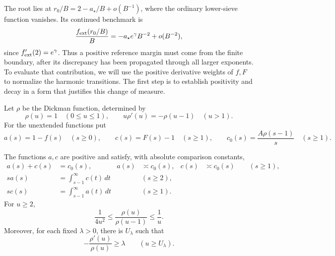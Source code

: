 The root lies at \(r_0/B=2-a_\star/B+o(B^{-1})\), where the ordinary
lower-sieve function vanishes.  Its continued benchmark is
\[
 \frac{f_{\rm ext}(r_0/B)}B
       =-a_\star e^\gamma B^{-2}+o(B^{-2}),
\]
since \(f'_{\rm ext}(2)=e^\gamma\).  Thus a positive reference margin
must come from the finite boundary, after its discrepancy has been
propagated through all larger exponents.  To evaluate that contribution,
we will use the positive derivative weights of \(f,F\) to normalize the
harmonic transitions.  The first step is to establish positivity and
decay in a form that justifies this change of measure.

Let \(\rho\) be the Dickman function, determined by
\[
 \rho(u)=1\quad(0\le u\le1),\qquad
 u\rho'(u)=-\rho(u-1)\quad(u>1).
\]
For the unextended functions put
\[
 a(s)=1-f(s)\quad(s\ge0),\qquad
 c(s)=F(s)-1\quad(s\ge1),\qquad
 c_0(s)=\frac{A\rho(s-1)}s\quad(s\ge1).
\]

\begin{lemma}\label{lem:future-integrals}
The functions \(a,c\) are positive and satisfy, with absolute comparison
constants,
\begin{align}
 a(s)+c(s)&=c_0(s),&
 a(s)&\asymp c_0(s),&
 c(s)&\asymp c_0(s)\qquad(s\ge1),\label{eq:functions-deficits}\\
 s a(s)&=\int_{s-1}^{\infty}c(t)\,dt
       &&(s\ge2),\label{eq:functions-future-a}\\
 s c(s)&=\int_{s-1}^{\infty}a(t)\,dt
       &&(s\ge1).\label{eq:functions-future-c}
\end{align}
For \(u\ge2\),
\begin{equation}\label{eq:functions-dickman-ratio}
 \frac1{4u^2}\le\frac{\rho(u)}{\rho(u-1)}\le\frac1u .
\end{equation}
Moreover, for each fixed \(\lambda>0\), there is \(U_\lambda\) such that
\begin{equation}\label{eq:functions-dickman-logderivative}
 -\frac{\rho'(u)}{\rho(u)}\ge\lambda\qquad(u\ge U_\lambda).
\end{equation}
\end{lemma}

